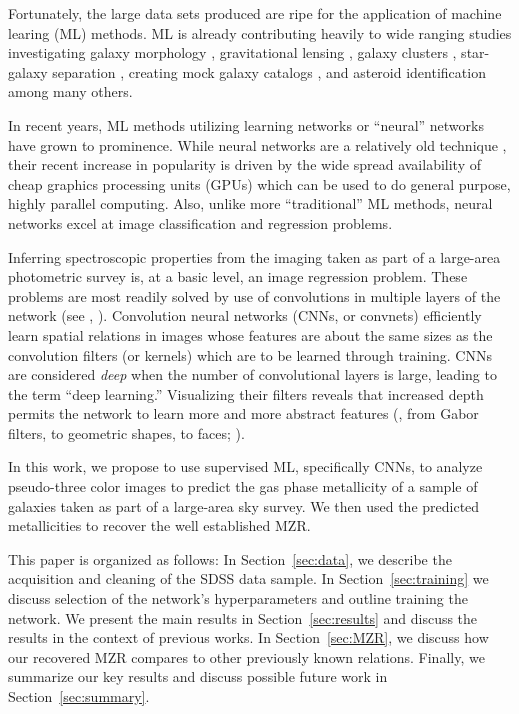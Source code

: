 \documentclass[fleqn,usenatbib]{mnras}
\begin{document}
Fortunately, the large data sets produced are ripe for the application of machine learing (ML) methods. ML is already contributing heavily to wide ranging studies investigating galaxy morphology , gravitational lensing , galaxy clusters , star-galaxy separation , creating mock galaxy catalogs , and asteroid identification  among many others.

In recent years, ML methods utilizing learning networks or ``neural'' networks have grown to prominence. While neural networks are a relatively old technique , their recent increase in popularity is driven by the wide spread availability of cheap graphics processing units (GPUs) which can be used to do general purpose, highly parallel computing. Also, unlike more ``traditional'' ML methods, neural networks excel at image classification and regression problems.

Inferring spectroscopic properties from the imaging taken as part of a large-area photometric survey is, at a basic level, an image regression problem. These problems are most readily solved by use of convolutions in multiple layers of the network (see \eg, \citealt{Krizhevsky2012}). Convolution neural networks (CNNs, or convnets) efficiently learn spatial relations in images whose features are about the same sizes as the convolution filters (or kernels) which are to be learned through training. CNNs are considered \textit{deep} when the number of convolutional layers is large, leading to the term ``deep learning.'' Visualizing their filters reveals that increased depth permits the network to learn more and more abstract features (\eg, from Gabor filters, to geometric shapes, to faces; \citealt{Zeiler2014}).

In this work, we propose to use supervised ML, specifically CNNs, to analyze pseudo-three color images to predict the gas phase metallicity of a sample of galaxies taken as part of a large-area sky survey. We then used the predicted metallicities to recover the well established MZR.

This paper is organized as follows: In Section~\ref{sec:data}, we describe the acquisition and cleaning of the SDSS data sample. In Section~\ref{sec:training} we discuss selection of the network's hyperparameters and outline training the network. We present the main results in Section~\ref{sec:results} and discuss the results in the context of previous works. In Section~\ref{sec:MZR}, we discuss how our recovered MZR compares to other previously known relations. Finally, we summarize our key results and discuss possible future work in Section~\ref{sec:summary}.
\end{document}

